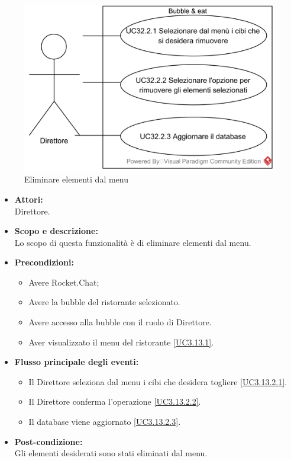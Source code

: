 \begin{samepage}
\nopagebreak
\begin{figure}[H]
	\centering
	\includegraphics[width=15cm]{../../documenti/AnalisiDeiRequisiti/Diagrammi_img/usecase/uc3_13_2.png}
	\caption{\UCFCaption{} Eliminare elementi dal menu}
\end{figure}
\end{samepage}


\begin{itemize}
	\item \textbf{Attori:}
	\\Direttore.
	\item \textbf{Scopo e descrizione:} 
	\\Lo scopo di questa funzionalità è di eliminare elementi dal menu.
	\item \textbf{Precondizioni:}
	\begin{itemize}
		\item Avere Rocket.Chat;
		\item Avere la bubble del ristorante selezionato.
		\item Avere accesso alla bubble con il ruolo di Direttore.
		\item Aver visualizzato il menu del ristorante \ref{UC3.13.1}.
	\end{itemize}
	\item \textbf{Flusso principale degli eventi:}
	\begin{itemize}
		\item Il Direttore seleziona dal menu i cibi che desidera togliere \ref{UC3.13.2.1}.
		\item Il Direttore conferma l'operazione \ref{UC3.13.2.2}.
		\item Il database viene aggiornato \ref{UC3.13.2.3}.
	\end{itemize}
	\item \textbf{Post-condizione:}
	\\Gli elementi desiderati sono stati eliminati dal menu.
\end{itemize}

